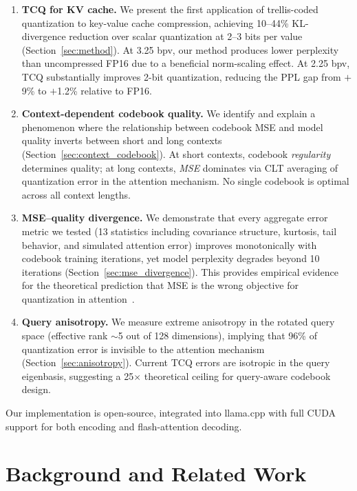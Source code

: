 \documentclass{article}
\begin{document}
\begin{enumerate}
\item \textbf{TCQ for KV cache.} We present the first application of
  trellis-coded quantization to key-value cache compression, achieving
  10--44\% KL-divergence reduction over scalar quantization at 2--3 bits per
  value (Section~\ref{sec:method}). At 3.25 bpv, our method produces lower
  perplexity than uncompressed FP16 due to a beneficial norm-scaling effect.
  At 2.25 bpv, TCQ substantially improves 2-bit quantization,
  reducing the PPL gap from $+$9\% to $+$1.2\% relative to FP16.

\item \textbf{Context-dependent codebook quality.} We identify and explain a
  phenomenon where the relationship between codebook MSE and model quality
  inverts between short and long contexts
  (Section~\ref{sec:context_codebook}). At short contexts, codebook
  \emph{regularity} determines quality; at long contexts, \emph{MSE}
  dominates via CLT averaging of quantization error in the attention
  mechanism. No single codebook is optimal across all context lengths.

\item \textbf{MSE--quality divergence.} We demonstrate that every aggregate
  error metric we tested (13 statistics including covariance structure,
  kurtosis, tail behavior, and simulated attention error) improves
  monotonically with codebook training iterations, yet model perplexity
  degrades beyond 10 iterations (Section~\ref{sec:mse_divergence}). This
  provides empirical evidence for the theoretical prediction that MSE is the
  wrong objective for quantization in attention~\cite{ordentlich2024matmul}.

\item \textbf{Query anisotropy.} We measure extreme anisotropy in the rotated
  query space (effective rank $\sim$5 out of 128 dimensions), implying that
  96\% of quantization error is invisible to the attention mechanism
  (Section~\ref{sec:anisotropy}). Current TCQ errors are isotropic in the
  query eigenbasis, suggesting a 25$\times$ theoretical ceiling for
  query-aware codebook design.
\end{enumerate}

\noindent Our implementation is open-source, integrated into llama.cpp with full CUDA
support for both encoding and flash-attention decoding.

\section{Background and Related Work}
\label{sec:background}
\end{document}
